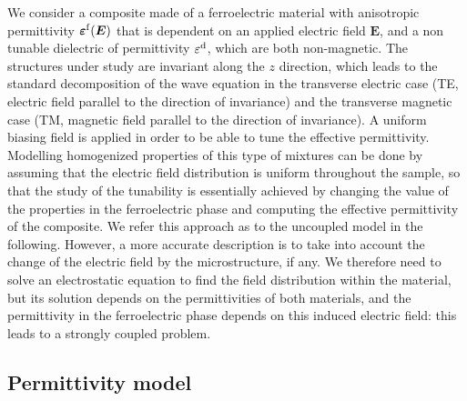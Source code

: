 \documentclass[aps,prb,11pt]{revtex4-1}
\newcommand{\B}{\boldsymbol}
\newcommand{\tens}[1]{\B{#1}}
\newcommand{\epsftens}{\tens{\varepsilon}^{\rm f}}
\newcommand{\epsd}{\varepsilon^{\rm d}}
\begin{document}
We consider a composite made of a ferroelectric material with anisotropic
permittivity $\epsftens(\B E)$
that is dependent on an applied electric field $\B E$,
and a non tunable dielectric of permittivity $\epsd$, which are both non-magnetic.
The structures under study are invariant along the $z$ direction, which leads to the standard decomposition
of the wave equation in the transverse electric case (TE, electric field parallel
to the direction of invariance) and the
transverse magnetic case (TM, magnetic field parallel to the direction
of invariance).
A uniform biasing field is applied in order to be able to tune the effective permittivity. Modelling homogenized properties of this type of mixtures can be done by assuming
that the electric field distribution is uniform throughout the sample,
so that the study of the tunability is
essentially achieved by changing the value of the properties in the ferroelectric phase and computing the effective permittivity of the composite.
We refer this approach as to the uncoupled model in the following.
However, a more accurate description is to take into account the change of the
electric field by the microstructure, if any. We therefore need to solve an
electrostatic equation to find the field distribution within the material, but its solution
depends on the permittivities of both materials, and the permittivity in the
ferroelectric phase depends on this induced electric field: this leads to a strongly coupled problem.\\

\subsection{Permittivity model\label{permmodel}}
\end{document}
